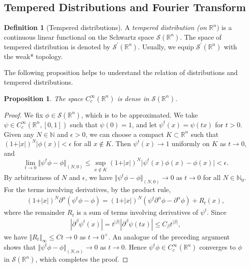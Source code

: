 \documentclass{article}
\numberwithin{equation}{section}
\newcommand{\bbN}{\mathbb{N}}
\newcommand{\bbR}{\mathbb{R}}
\renewcommand{\cal}{\mathcal}
\theoremstyle{plain}
\newtheorem{proposition}[theorem]{Proposition}
\theoremstyle{definition}
\newtheorem{definition}[theorem]{Definition}
\begin{document}
\newpage
\subsection{Tempered Distributions and Fourier Transform}
\begin{definition}[Tempered distributions]
A \textit{tempered distribution (on $\bbR^n)$} is a continuous linear functional on the Schwartz space $\cal{S}(\bbR^n)$. The space of tempered distribution is denoted by $\cal{S}^\prime(\bbR^n)$. Usually, we equip $\cal{S}^\prime(\bbR^n)$ with the weak* topology.
\end{definition}

The following proposition helps to understand the relation of distributions and tempered distributions.
\begin{proposition}\label{ccinftydenseinS}
The space $C_c^\infty({\bbR^n})$ is dense in $\cal{S}({\bbR^n})$.
\end{proposition}
\begin{proof}
We fix $\phi\in\cal{S}(\bbR^n)$, which is to be approximated. We take $\psi\in C_c^\infty(\bbR^n,[0,1])$ such that $\psi(0)=1$, and let $\psi^t(x)=\psi(tx)$ for $t>0$. Given any $N\in\bbN$ and $\epsilon>0$, we can choose a compact $K\subset\bbR^n$ such that $(1+\vert x\vert)^N\vert\phi(x)\vert<\epsilon$ for all $x\notin K$. Then $\psi^t(x)\to 1$ uniformly on $K$ as $t\to 0$, and $$\lim_{t\to 0}\Vert\psi^t\phi-\phi\Vert_{(N,0)}\leq\sup_{x\notin K}(1+\vert x\vert)^N\vert \psi^t(x)\phi(x)-\phi(x)\vert<\epsilon.$$ 
By arbitrariness of $N$ and $\epsilon$, we have $\Vert\psi^t\phi-\phi\Vert_{(N,0)}\to 0$ as $t\to 0$ for all $N\in\bbN_0$. For the terms involving derivatives, by the product rule,
\begin{align*}
	(1+\vert x\vert)^N\partial^\alpha(\psi^t\phi-\phi)=(1+\vert x\vert)^N(\psi^t\partial^\alpha\phi-\partial^\alpha\phi)+R_t(x),
\end{align*}
where the remainder $R_t$ is a sum of terms involving derivatives of $\psi^t$. Since
\begin{align*}
	\left\vert\partial^\beta\psi^t(x)\right\vert= t^{\vert\beta\vert}\left\vert\partial^\beta\psi(tx)\right\vert\leq C_\beta t^{\vert\beta\vert},
\end{align*}
we have $\Vert R_t\Vert_\infty\leq Ct\to 0$ as $t\to 0^+$. An analogue of the preceding argument shows that $\Vert\psi^t\phi-\phi\Vert_{(N,\alpha)}\to 0$ as $t\to 0$. Hence $\psi^t\phi\in C_c^\infty(\bbR^n)$ converges to $\phi$ in $\cal{S}(\bbR^n)$, which completes the proof.
\end{proof}
\end{document}
